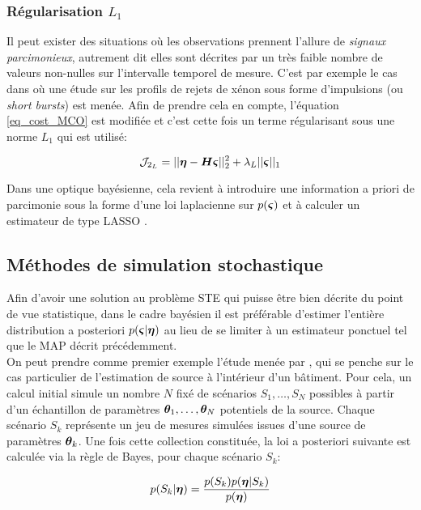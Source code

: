 \subsubsection{Régularisation $L_1$}

Il peut exister des situations où les observations prennent l'allure de \textit{signaux parcimonieux}, autrement dit elles sont décrites par un très faible nombre de valeurs non-nulles sur l'intervalle temporel de mesure. C'est par exemple le cas dans \cite{Martinez2013} où une étude sur les profils de rejets de xénon sous forme d'impulsions (ou \textit{short bursts}) est menée. Afin de prendre cela en compte, l'équation \eqref{eq_cost_MCO} est modifiée et c'est cette fois un terme régularisant sous une norme $L_1$ qui est utilisé: 

\begin{equation}
\mathcal{J}_{2_L} = ||{\bm{\eta}} - {\bm{H}}{\bm{\varsigma}}||_2^2 + \lambda_L ||{\bm{\varsigma}}||_1
\label{eq_MCO_L1}
\end{equation}

Dans une optique bayésienne, cela revient à introduire une information a priori de parcimonie sous la forme d'une loi laplacienne sur $p({\bm{\varsigma}})$ et à calculer un estimateur de type LASSO \cite{Tibshirani1996}.


\subsection{Méthodes de simulation stochastique}

Afin d'avoir une solution au problème STE qui puisse être bien décrite du point de vue statistique, dans le cadre bayésien il est préférable d'estimer l'entière distribution a posteriori $p({\bm{\varsigma}} | {\bm{\eta}})$ au lieu de se limiter à un estimateur ponctuel tel que le MAP décrit précédemment.\\


On peut prendre comme premier exemple l'étude menée par \cite{Sohn2002}, qui se penche sur le cas particulier de l'estimation de source à l'intérieur d'un bâtiment. Pour cela, un calcul initial simule un nombre $N$ fixé de scénarios $S_1,\dots,S_N$ possibles à partir d'un échantillon de paramètres ${\bm{\theta}}_1, \dots, {\bm{\theta}}_N$ potentiels de la source. Chaque scénario $S_k$ représente un jeu de mesures simulées issues d'une source de paramètres ${\bm{\theta}}_k$. Une fois cette collection constituée, la loi a posteriori suivante est calculée via la règle de Bayes, pour chaque scénario $S_k$:

\begin{equation}
\label{eq_bayes_monte_carlo}
p(S_k|{\bm{\eta}}) = \dfrac{p(S_k)p({\bm{\eta}} | S_k)}{p({\bm{\eta}})}
\end{equation}

